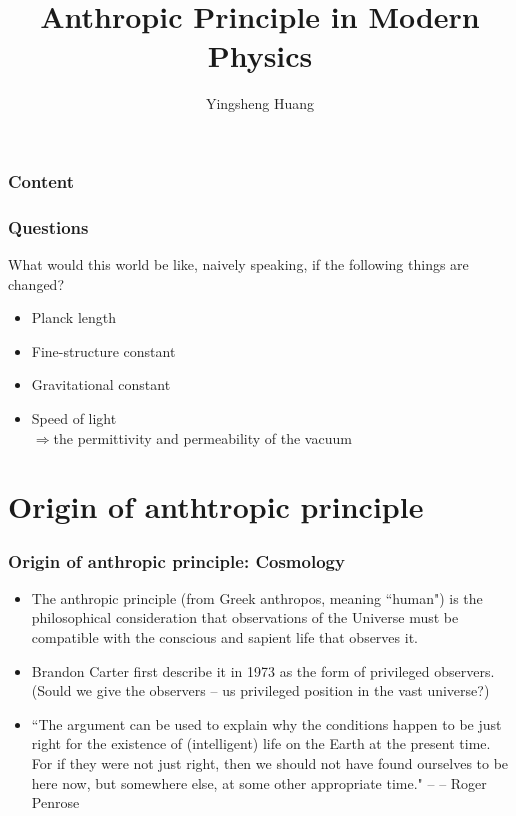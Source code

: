 \documentclass[8pt]{beamer}
\title{Anthropic Principle in Modern Physics}
\author{Yingsheng Huang}
\institute{Institute of High Energy Physics}
\newcommand{\phanitem}{\phantom{\item}}
\begin{document}
\maketitle
\begin{frame}
  \frametitle{Content}
  \tableofcontents
\end{frame}
\begin{frame}
  \frametitle{Questions}
  What would this world be like, naively speaking, if the following things are changed?


  \begin{itemize}
    \item Planck length
    \phanitem
    \item Fine-structure constant
    \phanitem
    \item Gravitational constant
    \phanitem
    \item Speed of light\\
    $\Longrightarrow$the permittivity and permeability of the vacuum
  \end{itemize}
\end{frame}
\section{Origin of anthtropic principle}
\begin{frame}
  \frametitle{Origin of anthropic principle: Cosmology}
  \begin{itemize}
    \item The anthropic principle (from Greek anthropos, meaning ``human") is the philosophical consideration that observations of the Universe must be compatible with the conscious and sapient life that observes it.
    \phanitem
    \item Brandon Carter first describe it in 1973 as the form of privileged observers. (Sould we give the observers -- us privileged position in the vast universe?)
    \phanitem
    \item ``The argument can be used to explain why the conditions happen to be just right for the existence of (intelligent) life on the Earth at the present time. For if they were not just right, then we should not have found ourselves to be here now, but somewhere else, at some other appropriate time." -- -- Roger Penrose
  \end{itemize}
\end{frame}
\end{document}
